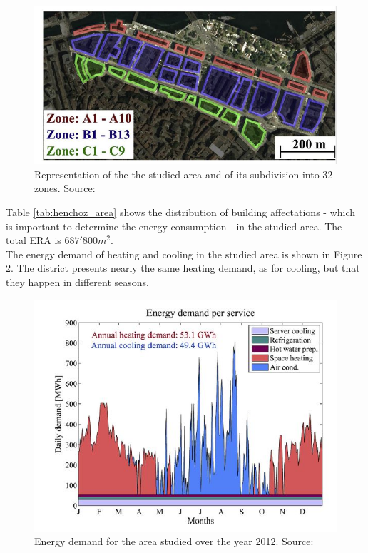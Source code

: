 \documentclass{article}
\begin{document}
\begin{figure}[h!]
\centering
\includegraphics[width=1\textwidth]{henchoz_gva.JPG}
\caption{Representation of the the studied area and of its subdivision into 32 zones. Source: \cite{henchozPotentialRefrigerantBased}}
\label{fig:henchoz_gva}
\end{figure}

Table \ref{tab:henchoz_area} shows the distribution of building affectations - which is important to determine the energy consumption - in the studied area. The total ERA is $687'800 m^{2}$.\\



The energy demand of heating and cooling in the studied area is shown in Figure \ref{fig:henchoz_energydemand}. The district presents nearly the same heating demand, as for cooling, but that they happen in different seasons. 

\begin{figure}[h!]
\centering
\includegraphics[width=1\textwidth]{henchoz_energydemand.JPG}
\caption{Energy demand for the area studied over the year 2012. Source: \cite{henchozPotentialRefrigerantBased}}
\label{fig:henchoz_energydemand}
\end{figure}
\end{document}
